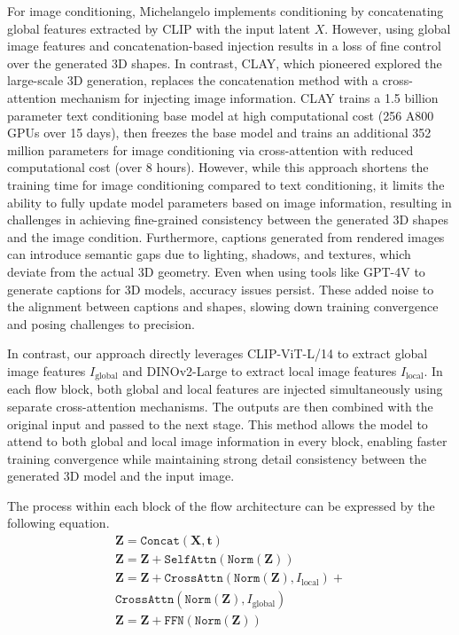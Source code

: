 For image conditioning, Michelangelo\cite{zhao2024michelangelo} implements conditioning by concatenating global features extracted by CLIP\cite{radford2021learning} with the input latent $X$. However, using global image features and concatenation-based injection results in a loss of fine control over the generated 3D shapes. In contrast, CLAY\cite{zhang2024clay}, which pioneered explored the large-scale 3D generation, replaces the concatenation method with a cross-attention mechanism for injecting image information. CLAY trains a 1.5 billion parameter text conditioning base model at high computational cost (256 A800 GPUs over 15 days), then freezes the base model and trains an additional 352 million parameters for image conditioning via cross-attention with reduced computational cost (over 8 hours). However, while this approach shortens the training time for image conditioning compared to text conditioning, it limits the ability to fully update model parameters based on image information, resulting in challenges in achieving fine-grained consistency between the generated 3D shapes and the image condition.
Furthermore, captions generated from rendered images can introduce semantic gaps due to lighting, shadows, and textures, which deviate from the actual 3D geometry. Even when using tools like GPT-4V\cite{openai2023gpt4v} to generate captions for 3D models, accuracy issues persist. These added noise to the alignment between captions and shapes, slowing down training convergence and posing challenges to precision.

In contrast, our approach directly leverages CLIP-ViT-L/14\cite{radford2021learning} to extract global image features $I_{\text{global}}$ and DINOv2-Large\cite{oquab2023dinov2} to extract local image features $I_\text{local}$. In each flow block, both global and local features are injected simultaneously using separate cross-attention mechanisms. The outputs are then combined with the original input and passed to the next stage. This method allows the model to attend to both global and local image information in every block, enabling faster training convergence while maintaining strong detail consistency between the generated 3D model and the input image.

The process within each block of the flow architecture can be expressed by the following equation.
\begin{gather}
\mathbf{Z}=\mathtt{Concat}\left(\mathbf{X, t}\right) \\
\mathbf{Z}=\mathbf{Z} + \mathtt{SelfAttn}\left(\mathtt{Norm}\left(\mathbf{Z}\right)\right) \\
\mathbf{Z}=\mathbf{Z} + \mathtt{CrossAttn}\left(\mathtt{Norm}\left(\mathbf{Z}\right), I_\text{local}\right) + \\ 
\mathtt{CrossAttn}\left(\mathtt{Norm}\left(\mathbf{Z}\right), I_{\text{global}}\right) \\
\mathbf{Z}=\mathbf{Z} + \mathtt{FFN}\left(\mathtt{Norm}\left(\mathbf{Z}\right)\right)
\end{gather}





